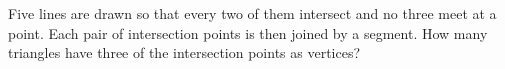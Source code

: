 Five lines are drawn so that every two of them intersect and no three meet at a point. Each pair of intersection points is then joined by a segment. How many triangles have three of the intersection points as vertices?
